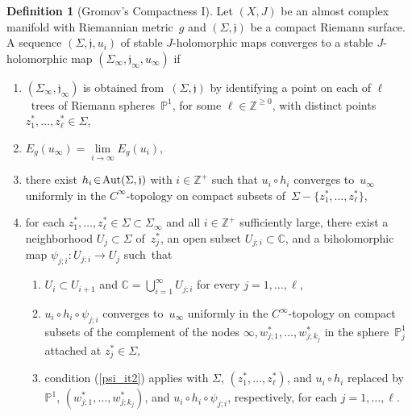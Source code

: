 \documentclass[11pt]{article}
\numberwithin{equation}{section}
\theoremstyle{definition}
\newtheorem{dfn}[thm]{Definition}
\def\sf#1{\textsf{#1}}
\def\lra{\longrightarrow}
\def\C{\mathbb{C}}
\def\fj{\mathfrak j}
\def\P{\mathbb{P}}
\def\Z{{\mathbb Z}}
\def\Si{\Sigma}
\def\i{\infty}
\def\Aut{\textnormal{Aut}}
\begin{document}
\begin{dfn}[Gromov's Compactness I]\label{GromConv_dfn1}
Let $(X,J)$ be an almost complex manifold with  Riemannian metric~$g$ and
$(\Si,\fj)$ be a compact Riemann surface. 
A sequence $(\Si,\fj,u_i)$ of stable \hbox{$J$-holomorphic} maps 
\sf{converges} to a stable $J$-holomorphic map $(\Si_{\i},\fj_{\i},u_{\i})$
if
\begin{enumerate}[label=(\arabic*),ref=\arabic*,leftmargin=*]

\item $(\Si_{\i},\fj_{\i})$ is obtained from~$(\Si,\fj)$ by identifying 
a point on each of $\ell$~trees of Riemann spheres~$\P^1$, for some $\ell\!\in\!\Z^{\ge0}$,
with distinct points $z_1^*,\ldots,z_{\ell}^*\!\in\!\Si$,

\item\label{GC1energy_it} $E_g(u_{\i})=\lim\limits_{i\lra\i}E_g(u_i)$,

\item there exist $h_i\!\in\!\Aut(\Si,\fj)$ with $i\!\in\!\Z^+$ such that 
$u_i\!\circ\!h_i$ converges to~$u_{\i}$ uniformly in the $C^{\i}$-topology on compact 
subsets of~$\Si\!-\!\{z_1^*,\ldots,z_{\ell}^*\}$,

\item\label{psi_it2} for each $z_1^*,\ldots,z_{\ell}^*\!\in\!\Si\!\subset\!\Si_{\i}$
and all $i\!\in\!\Z^+$ sufficiently large,
there exist a neighborhood $U_j\!\subset\!\Si$ of~$z_j^*$, 
an open subset $U_{j;i}\!\subset\!\C$, and
a biholomorphic map $\psi_{j;i}\!:U_{j;i}\!\lra\!U_j$   such~that 
\begin{enumerate}[label=(\ref{psi_it2}\alph*),leftmargin=*]

\item $U_i\!\subset\!U_{i+1}$ and 
$\C=\bigcup_{i=1}^{\i}U_{j;i}$ for every $j\!=\!1,\ldots,\ell$,

\item $u_i\!\circ\!h_i\!\circ\!\psi_{j;i}$ 
converges to~$u_{\i}$ uniformly in the $C^{\i}$-topology 
on compact subsets of the complement of the nodes $\i,w_{j;1}^*,\ldots,w_{j;k_j}^*$
in the sphere~$\P_j^1$ attached  at $z_j^*\!\in\!\Si$,

\item condition (\ref{psi_it2}) applies with
$\Si$, $(z_1^*,\ldots,z_{\ell}^*)$, and $u_i\!\circ\!h_i$
replaced by~$\P^1$, $(w_{j;1}^*,\ldots,w_{j;k_j}^*)$, and
$u_i\!\circ\!h_i\!\circ\!\psi_{j;i}$, respectively,
for each $j\!=\!1,\ldots,\ell$.

\end{enumerate}
\end{enumerate}
\end{dfn}
\end{document}
